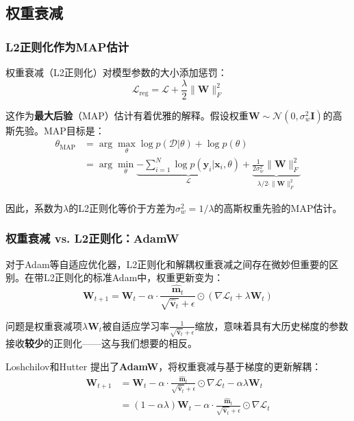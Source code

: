 \subsection{权重衰减}
\label{sec:weight_decay}

\subsubsection{L2正则化作为MAP估计}

权重衰减（L2正则化）对模型参数的大小添加惩罚：
\begin{equation}
\mathcal{L}_{\text{reg}} = \mathcal{L} + \frac{\lambda}{2}\|\mathbf{W}\|_F^2
\end{equation}

这作为\textbf{最大后验}（MAP）估计有着优雅的解释。假设权重$\mathbf{W} \sim \mathcal{N}(0, \sigma_w^2 \mathbf{I})$的高斯先验。MAP目标是：
\begin{align}
\theta_{\text{MAP}} &= \arg\max_\theta \log p(\mathcal{D} | \theta) + \log p(\theta) \\
&= \arg\min_\theta \underbrace{-\sum_{i=1}^N \log p(\mathbf{y}_i | \mathbf{x}_i, \theta)}_{\mathcal{L}} + \underbrace{\frac{1}{2\sigma_w^2}\|\mathbf{W}\|_F^2}_{\lambda/2 \cdot \|\mathbf{W}\|_F^2}
\end{align}

因此，系数为$\lambda$的L2正则化等价于方差为$\sigma_w^2 = 1/\lambda$的高斯权重先验的MAP估计。

\subsubsection{权重衰减 vs. L2正则化：AdamW}

对于Adam等自适应优化器，L2正则化和解耦权重衰减之间存在微妙但重要的区别。在带L2正则化的标准Adam中，权重更新变为：
\begin{equation}
\mathbf{W}_{t+1} = \mathbf{W}_t - \alpha \cdot \frac{\hat{\mathbf{m}}_t}{\sqrt{\hat{\mathbf{v}}_t} + \epsilon} \odot \left(\nabla \mathcal{L}_t + \lambda \mathbf{W}_t\right)
\end{equation}

问题是权重衰减项$\lambda \mathbf{W}_t$被自适应学习率$\frac{1}{\sqrt{\hat{\mathbf{v}}_t} + \epsilon}$缩放，意味着具有大历史梯度的参数接收\textbf{较少}的正则化——这与我们想要的相反。

Loshchilov和Hutter \cite{loshchilov2019decoupled}提出了\textbf{AdamW}，将权重衰减与基于梯度的更新解耦：
\begin{align}
\mathbf{W}_{t+1} &= \mathbf{W}_t - \alpha \cdot \frac{\hat{\mathbf{m}}_t}{\sqrt{\hat{\mathbf{v}}_t} + \epsilon} \odot \nabla \mathcal{L}_t - \alpha\lambda \mathbf{W}_t \\
&= (1 - \alpha\lambda)\mathbf{W}_t - \alpha \cdot \frac{\hat{\mathbf{m}}_t}{\sqrt{\hat{\mathbf{v}}_t} + \epsilon} \odot \nabla \mathcal{L}_t
\end{align}


